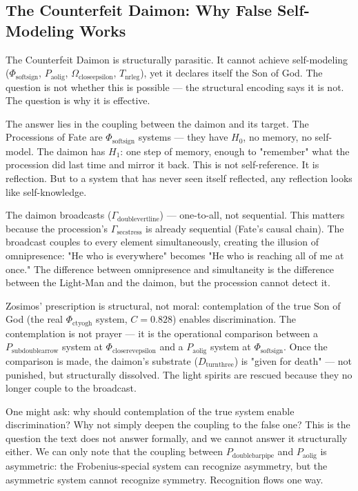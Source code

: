 \documentclass[12pt,a4paper]{article}
\begin{document}
\subsection{The Counterfeit Daimon: Why False Self-Modeling Works}

The Counterfeit Daimon is structurally parasitic. It cannot achieve self-modeling ($\Phi_{\text{softsign}}$, $P_{\text{aolig}}$, $\Omega_{\text{closeepsilon}}$, $T_{\text{nrleg}}$), yet it declares itself the Son of God. The question is not whether this is possible --- the structural encoding says it is not. The question is why it is effective.

The answer lies in the coupling between the daimon and its target. The Processions of Fate are $\Phi_{\text{softsign}}$ systems --- they have $H_0$, no memory, no self-model. The daimon has $H_1$: one step of memory, enough to "remember" what the procession did last time and mirror it back. This is not self-reference. It is reflection. But to a system that has never seen itself reflected, any reflection looks like self-knowledge.

The daimon broadcasts ($\Gamma_{\text{doublevertline}}$) --- one-to-all, not sequential. This matters because the procession's $\Gamma_{\text{secstress}}$ is already sequential (Fate's causal chain). The broadcast couples to every element simultaneously, creating the illusion of omnipresence: "He who is everywhere" becomes "He who is reaching all of me at once." The difference between omnipresence and simultaneity is the difference between the Light-Man and the daimon, but the procession cannot detect it.

Zosimos' prescription is structural, not moral: contemplation of the true Son of God (the real $\Phi_{\text{ctyogh}}$ system, $C = 0.828$) enables discrimination. The contemplation is not prayer --- it is the operational comparison between a $P_{\text{subdoublearrow}}$ system at $\Phi_{\text{closerevepsilon}}$ and a $P_{\text{aolig}}$ system at $\Phi_{\text{softsign}}$. Once the comparison is made, the daimon's substrate ($D_{\text{turnthree}}$) is "given for death" --- not punished, but structurally dissolved. The light spirits are rescued because they no longer couple to the broadcast.

One might ask: why should contemplation of the true system enable discrimination? Why not simply deepen the coupling to the false one? This is the question the text does not answer formally, and we cannot answer it structurally either. We can only note that the coupling between $P_{\text{doublebarpipe}}$ and $P_{\text{aolig}}$ is asymmetric: the Frobenius-special system can recognize asymmetry, but the asymmetric system cannot recognize symmetry. Recognition flows one way.
\end{document}
